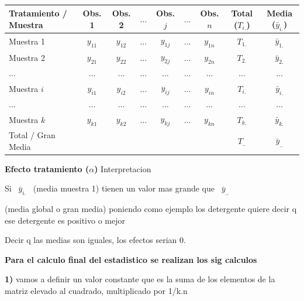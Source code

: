 \documentclass[12pt,a4paper]{article}
\begin{document}
\begin{center}
{\fontsize{8.8}{10.6}\selectfont
\setlength{\tabcolsep}{5pt}
\begin{tabular}{l c c c c c c | c c}
\toprule
Tratamiento / Muestra & Obs. 1 & Obs. 2 & $\ldots$ & Obs. $j$ & $\ldots$ & Obs. $n$ & Total ($T_{i.}$) & Media ($\bar{y}_{i.}$) \\
\midrule
Muestra 1 & $y_{11}$ & $y_{12}$ & $\ldots$ & $y_{1j}$ & $\ldots$ & $y_{1n}$ & $T_{1.}$ & $\bar{y}_{1.}$ \\
Muestra 2 & $y_{21}$ & $y_{22}$ & $\ldots$ & $y_{2j}$ & $\ldots$ & $y_{2n}$ & $T_{2.}$ & $\bar{y}_{2.}$ \\
$\ldots$ & $\ldots$ & $\ldots$ & $\ldots$ & $\ldots$ & $\ldots$ & $\ldots$ & $\ldots$ & $\ldots$ \\
Muestra $i$ & $y_{i1}$ & $y_{i2}$ & $\ldots$ & $y_{ij}$ & $\ldots$ & $y_{in}$ & $T_{i.}$ & $\bar{y}_{i.}$ \\
$\ldots$ & $\ldots$ & $\ldots$ & $\ldots$ & $\ldots$ & $\ldots$ & $\ldots$ & $\ldots$ & $\ldots$ \\
Muestra $k$ & $y_{k1}$ & $y_{k2}$ & $\ldots$ & $y_{kj}$ & $\ldots$ & $y_{kn}$ & $T_{k.}$ & $\bar{y}_{k.}$ \\
\midrule
Total / Gran Media & & & & & & & $T_{..}$ & $\bar{y}_{..}$ \\
\bottomrule
\end{tabular}
}
\end{center}

\textbf{Efecto tratamiento ($\alpha$)} Interpretacion

\begin{minipage}[t]{0.60\linewidth}
\vspace{0pt}
Si \ $\bar{y}_{i.}$ \ (media muestra 1) tienen un valor mas grande que \ $\bar{y}_{..}$
\end{minipage}\hfill
\begin{minipage}[t]{0.38\linewidth}
\vspace{0pt}
{\small (media global o gran media) poniendo como ejemplo los detergente quiere decir q ese detergente es positivo o mejor}
\end{minipage}

Decir q las medias son iguales, los efectos serian 0.

\textbf{Para el calculo final del estadistico se realizan los sig calculos}

\textbf{1)} vamos a definir un valor constante que es la suma de los elementos de la matriz elevado al cuadrado, multiplicado por 1/k.n
\end{document}
